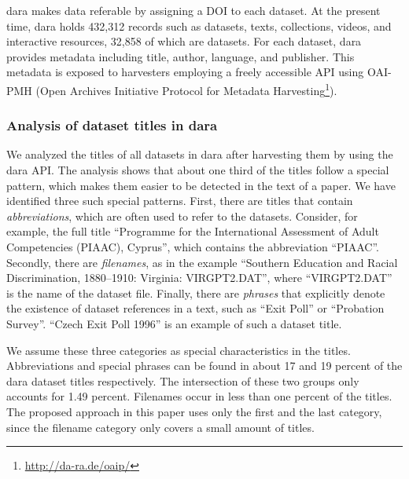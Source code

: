 \documentclass{IOS-Book-Article}
\newcommand{\dara}{\textsf{da\textbar ra}}
\begin{document}
{\dara} makes 
data referable 
by assigning a DOI to each dataset.
At the present time, {\dara} holds 432,312 records such as datasets, texts, collections, videos, and interactive resources, 32,858 of which are datasets. 
For each dataset, {\dara} provides metadata including title, author, language, and publisher.
This metadata is exposed to harvesters employing a freely accessible API using OAI-PMH (Open Archives Initiative Protocol for Metadata Harvesting\footnote{\url{http://da-ra.de/oaip/}}). 
  
  \subsubsection{Analysis of dataset titles in {\dara}}
  We analyzed the titles of all datasets in {\dara} after harvesting them by using the {\dara} API.
  The analysis shows that about one third of the titles follow a special pattern, which makes them easier to be detected in the text of a paper.
  We have identified three such special patterns.
  First, there are titles that contain \emph{abbreviations}, which are often used to refer to the datasets. 
  Consider, for example, the full title \enquote{Programme for the International Assessment of Adult Competencies (PIAAC), Cyprus}, which contains the abbreviation \enquote{PIAAC}.
  Secondly, there are \emph{filenames}, as in the example \enquote{Southern Education and Racial Discrimination, 1880--1910: Virginia: VIRGPT2.DAT}, where \enquote{VIRGPT2.DAT} is the name of the dataset file.
  Finally, there are \emph{phrases} that explicitly denote the existence of 
  dataset references in a text, such as \enquote{Exit Poll} or \enquote{Probation Survey}.
  \enquote{Czech Exit Poll 1996} is an example of such a dataset title. 

  We assume these three categories as special characteristics in the titles.
  Abbreviations and special phrases can be found in about 17 and 19 percent of the {\dara} dataset titles respectively.
  The intersection of these two groups only accounts for 1.49 percent.
  Filenames occur in less than one percent of the titles. 
The proposed approach in this paper uses only the first and the last category, since the filename category only covers a small amount of titles.
\end{document}
